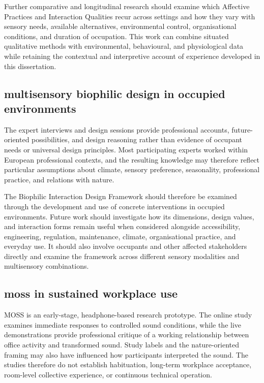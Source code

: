 Further comparative and longitudinal research should examine which
Affective Practices and Interaction Qualities recur across settings and
how they vary with sensory needs, available alternatives, environmental
control, organisational conditions, and duration of occupation. This
work can combine situated qualitative methods with environmental,
behavioural, and physiological data while retaining the contextual and
interpretive account of experience developed in this dissertation.


\subsection{multisensory biophilic design in occupied environments}
\label{subsec:limitations-biophilic}

The expert interviews and design sessions provide professional accounts,
future-oriented possibilities, and design reasoning rather than evidence
of occupant needs or universal design principles. Most participating
experts worked within European professional contexts, and the resulting
knowledge may therefore reflect particular assumptions about climate,
sensory preference, seasonality, professional practice, and relations
with nature.

The Biophilic Interaction Design Framework should therefore be examined
through the development and use of concrete interventions in occupied
environments. Future work should investigate how its dimensions, design
values, and interaction forms remain useful when considered alongside
accessibility, engineering, regulation, maintenance, climate,
organisational practice, and everyday use. It should also involve
occupants and other affected stakeholders directly and examine the
framework across different sensory modalities and multisensory
combinations.


\subsection{moss in sustained workplace use}
\label{subsec:limitations-sound}

MOSS is an early-stage, headphone-based research prototype. The online
study examines immediate responses to controlled sound conditions, while
the live demonstrations provide professional critique of a working
relationship between office activity and transformed sound. Study labels
and the nature-oriented framing may also have influenced how participants
interpreted the sound. The studies therefore do not establish
habituation, long-term workplace acceptance, room-level collective
experience, or continuous technical operation.

